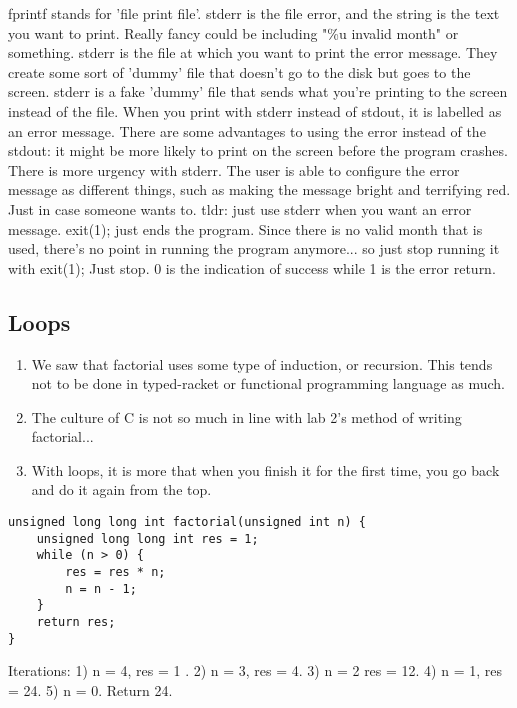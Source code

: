 \documentclass[12pt]{article}
\theoremstyle{definition}
\begin{document}
\term fprintf stands for 'file print file'. stderr is the file error, and the string is the text you want to print. Really fancy could be including "\%u invalid month" or something. stderr is the file at which you want to print the error message. They create some sort of 'dummy' file that doesn't go to the disk but goes to the screen. stderr is a fake 'dummy' file that sends what you're printing to the screen instead of the file. When you print with stderr instead of stdout, it is labelled as an error message. There are some advantages to using the error instead of the stdout: it might be more likely to print on the screen before the program crashes. There is more urgency with stderr. The user is able to configure the error message as different things, such as making the message bright and terrifying red. Just in case someone wants to. 
tldr: just use stderr when you want an error message. 
\term exit(1); just ends the program. Since there is no valid month that is used, there's no point in running the program anymore... so just stop running it with exit(1); Just stop. 0 is the indication of success while 1 is the error return. 

\subsection{Loops}
\begin{enumerate}
    \item We saw that factorial uses some type of induction, or recursion. This tends not to be done in typed-racket or functional programming language as much. 
    \item The culture of C is not so much in line with lab 2's method of writing factorial...
    \item With loops, it is more that when you finish it for the first time, you go back and do it again from the top. 
\end{enumerate}

\begin{lstlisting}
unsigned long long int factorial(unsigned int n) {
    unsigned long long int res = 1; 
    while (n > 0) {
        res = res * n;
        n = n - 1;
    }
    return res;
}
\end{lstlisting}
\note Iterations: 1) n = 4, res = 1 . 2) n = 3, res = 4. 3) n = 2 res = 12. 4) n = 1, res = 24. 5) n = 0. Return 24. 
\end{document}
